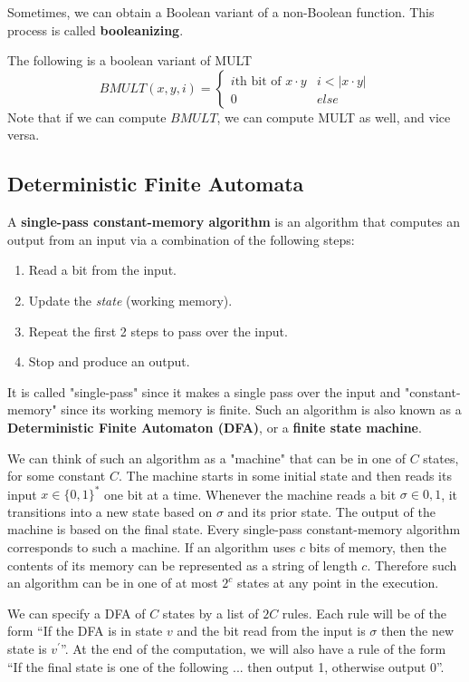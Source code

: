   \begin{definition}
    Sometimes, we can obtain a Boolean variant of a non-Boolean function. This process is called \textbf{booleanizing}. 
  \end{definition}

  \begin{example}
    The following is a boolean variant of MULT
    \[BMULT(x, y, i) = \begin{cases}
    i\text{th bit of } x\cdot y & i < |x \cdot y|\\
    0 & else
    \end{cases}\]
    Note that if we can compute $BMULT$, we can compute MULT as well, and vice versa. 
  \end{example}

\subsection{Deterministic Finite Automata}

  \begin{definition}
  A \textbf{single-pass constant-memory algorithm} is an algorithm that computes an output from an input via a combination of the following steps: 
  \begin{enumerate}
      \item Read a bit from the input. 
      \item Update the \textit{state} (working memory). 
      \item Repeat the first 2 steps to pass over the input. 
      \item Stop and produce an output. 
  \end{enumerate}
  It is called "single-pass" since it makes a single pass over the input and "constant-memory" since its working memory is finite. Such an algorithm is also known as a \textbf{Deterministic Finite Automaton (DFA)}, or a \textbf{finite state machine}. 

  We can think of such an algorithm as a "machine" that can be in one of $C$ states, for some constant $C$. The machine starts in some initial state and then reads its input $x \in \{0, 1\}^*$ one bit at a time. Whenever the machine reads a bit $\sigma \in {0, 1}$, it transitions into a new state based on $\sigma$ and its prior state. The output of the machine is based on the final state. Every single-pass constant-memory algorithm corresponds to such a machine. If an algorithm uses $c$ bits of memory, then the contents of its memory can be represented as a string of length $c$. Therefore such an algorithm can be in one of at most $2^c$ states at any point in the execution.

  We can specify a DFA of $C$ states by a list of $2C$ rules. Each rule will be of the form “If the DFA is in state $v$ and the bit read from the input is $\sigma$ then the new state is $v^\prime$”. At the end of the computation, we will also have a rule of the form “If the final state is one of the following ... then output 1, otherwise output 0”. 
  \end{definition}

